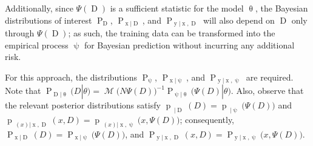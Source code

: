 \documentclass[12pt]{report}
\DeclareMathOperator{\xrm}{\mathrm{x}}
\DeclareMathOperator{\yrm}{\mathrm{y}}
\DeclareMathOperator{\Drm}{\mathrm{D}}
\DeclareMathOperator{\Prm}{\mathrm{P}}
\DeclareMathOperator{\prm}{\mathrm{p}}
\DeclareMathOperator{\Mcal}{\mathcal{M}}
\DeclareMathOperator{\upthetam}{\uptheta_\text{m}}
\DeclareMathOperator{\upthetac}{\uptheta_\text{c}}
\begin{document}
Additionally, since $\Psi(\Drm)$ is a sufficient statistic for the model $\uptheta$, the Bayesian distributions of interest $\Prm_{\Drm}$, $\Prm_{\xrm | \Drm}$, and $\Prm_{\yrm | \xrm,\Drm}$ will also depend on $\Drm$ only through $\Psi(\Drm)$; as such, the training data can be transformed into the empirical process $\uppsi$ for Bayesian prediction without incurring any additional risk. 

For this approach, the distributions $\Prm_{\uppsi}$, $\Prm_{\xrm | \uppsi}$, and $\Prm_{\yrm | \xrm,\uppsi}$ are required. Note that $\Prm_{\Drm | \uptheta}(D | \theta) = \Mcal\big( N \Psi(D) \big)^{-1} \Prm_{\uppsi | \uptheta}\big( \Psi(D) | \theta \big)$. Also, observe that the relevant posterior distributions satisfy $\prm_{\upthetam | \Drm}(D) = \prm_{\upthetam | \uppsi}\big( \Psi(D) \big)$ and $\prm_{\upthetac(x) | \xrm,\Drm}(x,D) = \prm_{\upthetac(x) | \xrm,\uppsi}\big( x,\Psi(D) \big)$; consequently, $\Prm_{\xrm | \Drm}(D) = \Prm_{\xrm | \uppsi}\big( \Psi(D) \big)$, and $\Prm_{\yrm | \xrm,\Drm}(x,D) = \Prm_{\yrm | \xrm,\uppsi}\big( x,\Psi(D) \big)$.
\end{document}
